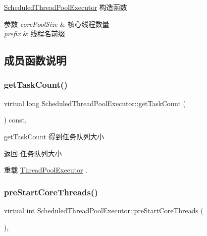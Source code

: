 \hyperlink{classScheduledThreadPoolExecutor}{Scheduled\+Thread\+Pool\+Executor} 构造函数 


\begin{DoxyParams}{参数}
{\em core\+Pool\+Size} & 核心线程数量 \\
\hline
{\em prefix} & 线程名前缀 \\
\hline
\end{DoxyParams}


\subsection{成员函数说明}
\mbox{\label{classScheduledThreadPoolExecutor_a786bc8478d265dfe0288de9397c7f768}} 
\subsubsection{\texorpdfstring{get\+Task\+Count()}{getTaskCount()}}
{\footnotesize\ttfamily virtual long Scheduled\+Thread\+Pool\+Executor\+::get\+Task\+Count (\begin{DoxyParamCaption}{ }\end{DoxyParamCaption}) const\hspace{0.3cm}{\ttfamily [inline]}, {\ttfamily [virtual]}}



get\+Task\+Count 得到任务队列大小 

\begin{DoxyReturn}{返回}
任务队列大小 
\end{DoxyReturn}


重载 \hyperlink{classThreadPoolExecutor_a61e8321202e6b0f6ea014485e8e10450}{Thread\+Pool\+Executor} .

\mbox{\label{classScheduledThreadPoolExecutor_aed48379bdc243fd07e593205ca28f48d}} 
\subsubsection{\texorpdfstring{pre\+Start\+Core\+Threads()}{preStartCoreThreads()}}
{\footnotesize\ttfamily virtual int Scheduled\+Thread\+Pool\+Executor\+::pre\+Start\+Core\+Threads (\begin{DoxyParamCaption}{ }\end{DoxyParamCaption})\hspace{0.3cm}{\ttfamily [inline]}, {\ttfamily [virtual]}}



